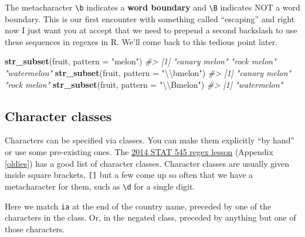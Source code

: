 \documentclass[
]{book}
\newenvironment{Shaded}{\begin{snugshade}}{\end{snugshade}}
\newcommand{\CharTok}[1]{\textcolor[rgb]{0.31,0.60,0.02}{#1}}
\newcommand{\CommentTok}[1]{\textcolor[rgb]{0.56,0.35,0.01}{\textit{#1}}}
\newcommand{\DataTypeTok}[1]{\textcolor[rgb]{0.13,0.29,0.53}{#1}}
\newcommand{\KeywordTok}[1]{\textcolor[rgb]{0.13,0.29,0.53}{\textbf{#1}}}
\newcommand{\NormalTok}[1]{#1}
\newcommand{\StringTok}[1]{\textcolor[rgb]{0.31,0.60,0.02}{#1}}
\begin{document}
The metacharacter \texttt{\textbackslash{}b} indicates a \textbf{word boundary} and \texttt{\textbackslash{}B} indicates NOT a word boundary. This is our first encounter with something called ``escaping'' and right now I just want you at accept that we need to prepend a second backslash to use these sequences in regexes in R. We'll come back to this tedious point later.

\begin{Shaded}
\begin{Highlighting}[]
\KeywordTok{str_subset}\NormalTok{(fruit, }\DataTypeTok{pattern =} \StringTok{"melon"}\NormalTok{)}
\CommentTok{#> [1] "canary melon" "rock melon"   "watermelon"}
\KeywordTok{str_subset}\NormalTok{(fruit, }\DataTypeTok{pattern =} \StringTok{"}\CharTok{\textbackslash{}\textbackslash{}}\StringTok{bmelon"}\NormalTok{)}
\CommentTok{#> [1] "canary melon" "rock melon"}
\KeywordTok{str_subset}\NormalTok{(fruit, }\DataTypeTok{pattern =} \StringTok{"}\CharTok{\textbackslash{}\textbackslash{}}\StringTok{Bmelon"}\NormalTok{)}
\CommentTok{#> [1] "watermelon"}
\end{Highlighting}
\end{Shaded}

\hypertarget{character-classes}{%
\subsection{Character classes}\label{character-classes}}

Characters can be specified via classes. You can make them explicitly ``by hand'' or use some pre-existing ones. The \protect\hyperlink{oldies}{2014 STAT 545 regex lesson} (Appendix \ref{oldies}) has a good list of character classes. Character classes are usually given inside square brackets, \texttt{{[}{]}} but a few come up so often that we have a metacharacter for them, such as \texttt{\textbackslash{}d} for a single digit.

Here we match \texttt{ia} at the end of the country name, preceded by one of the characters in the class. Or, in the negated class, preceded by anything but one of those characters.

\begin{Shaded}
\end{Shaded}
\end{document}
